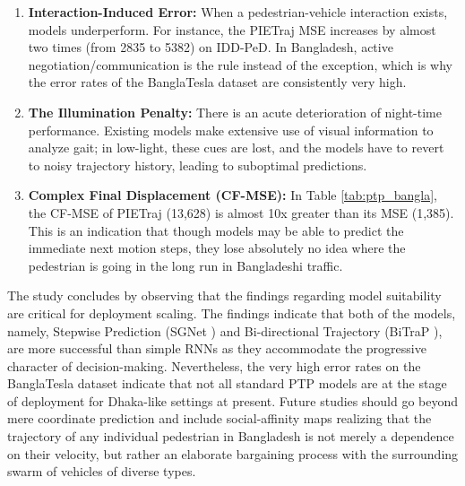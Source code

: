 \documentclass[12pt, a4paper]{article}
\begin{document}
\begin{enumerate}
    \item \textbf{Interaction-Induced Error:} When a pedestrian-vehicle interaction exists, models underperform. For instance, the PIETraj \cite{rasouli2019pie} MSE increases by almost two times (from 2835 to 5382) on IDD-PeD. In Bangladesh, active negotiation/communication is the rule instead of the exception, which is why the error rates of the BanglaTesla dataset are consistently very high.
    \item \textbf{The Illumination Penalty:} There is an acute deterioration of night-time performance. Existing models make extensive use of visual information to analyze gait; in low-light, these cues are lost, and the models have to revert to noisy trajectory history, leading to suboptimal predictions.
    \item \textbf{Complex Final Displacement (CF-MSE):} In Table \ref{tab:ptp_bangla}, the CF-MSE of PIETraj (13,628) is almost 10x greater than its MSE (1,385). This is an indication that though models may be able to predict the immediate next motion steps, they lose absolutely no idea where the pedestrian is going in the long run in Bangladeshi traffic.
\end{enumerate}

The study concludes by observing that the findings regarding model suitability are critical for deployment scaling. The findings indicate that both of the models, namely, Stepwise Prediction (SGNet \cite{wang2022stepwise}) and Bi-directional Trajectory (BiTraP \cite{yao2021bitrap}), are more successful than simple RNNs as they accommodate the progressive character of decision-making. Nevertheless, the very high error rates on the BanglaTesla dataset indicate that not all standard PTP models are at the stage of deployment for Dhaka-like settings at present. Future studies should go beyond mere coordinate prediction and include social-affinity maps realizing that the trajectory of any individual pedestrian in Bangladesh is not merely a dependence on their velocity, but rather an elaborate bargaining process with the surrounding swarm of vehicles of diverse types.
\end{document}
